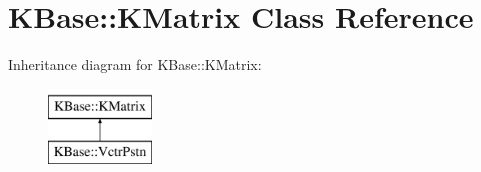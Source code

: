 \hypertarget{class_k_base_1_1_k_matrix}{\section{K\-Base\-:\-:K\-Matrix Class Reference}
\label{class_k_base_1_1_k_matrix}
}
Inheritance diagram for K\-Base\-:\-:K\-Matrix\-:\begin{figure}[H]
\begin{center}
\leavevmode
\includegraphics[height=2.000000cm]{class_k_base_1_1_k_matrix}
\end{center}
\end{figure}
